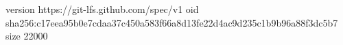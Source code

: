 version https://git-lfs.github.com/spec/v1
oid sha256:c17eea95b0e7cdaa37c450a583f66a8d13fe22d4ac9d235c1b9b96a88f3dc5b7
size 22000
